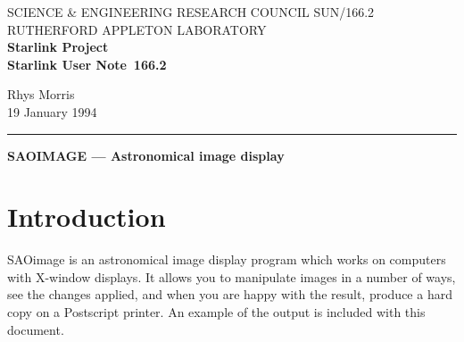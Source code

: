 \pagestyle{myheadings}

\newcommand{\stardoccategory}  {Starlink User Note}
\newcommand{\stardocinitials}  {SUN}
\newcommand{\stardocnumber}    {166.2}
\newcommand{\stardocauthors}   {Rhys Morris}
\newcommand{\stardocdate}      {19 January 1994}
\newcommand{\stardoctitle}     {SAOIMAGE --- Astronomical image display}

\newcommand{\stardocname}{\stardocinitials /\stardocnumber}
\renewcommand{\_}{{\tt\char'137}}     %
\markright{\stardocname}
\setlength{\textwidth}{160mm}
\setlength{\textheight}{230mm}
\setlength{\topmargin}{-2mm}
\setlength{\oddsidemargin}{0mm}
\setlength{\evensidemargin}{0mm}
\setlength{\parindent}{0mm}
\setlength{\parskip}{\medskipamount}
\setlength{\unitlength}{1mm}



\thispagestyle{empty}
SCIENCE \& ENGINEERING RESEARCH COUNCIL \hfill \stardocname\\
RUTHERFORD APPLETON LABORATORY\\
{\large\bf Starlink Project\\}
{\large\bf \stardoccategory\ \stardocnumber}
\begin{flushright}
\stardocauthors\\
\stardocdate
\end{flushright}
\vspace{-4mm}
\rule{\textwidth}{0.5mm}
\vspace{5mm}
\begin{center}
{\Large\bf \stardoctitle}
\end{center}
\vspace{5mm}

\section{Introduction}

SAOimage is an astronomical image display program which works on
computers with X-window displays. It allows you to manipulate images
in a number of ways, see the changes applied, and when you are  happy
with the result, produce a hard copy on a Postscript
printer. An example of the output is included with this document.

